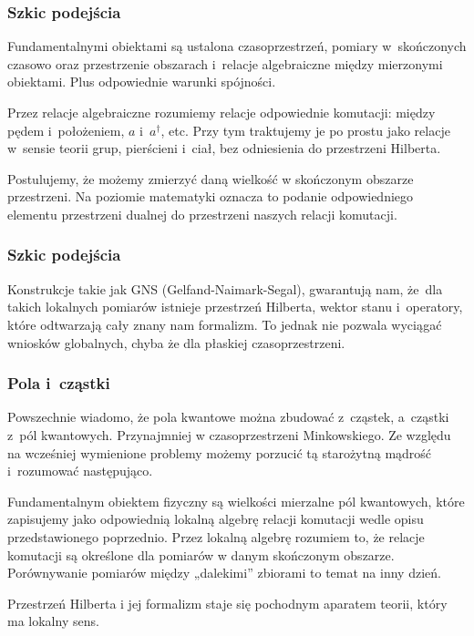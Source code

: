 \documentclass[10pt,t]{beamer}
\begin{document}
\begin{frame}
  \frametitle{Szkic podejścia}


  Fundamentalnymi obiektami są ustalona czasoprzestrzeń, pomiary
  w~skończonych czasowo oraz przestrzenie obszarach i~relacje
  algebraiczne między mierzonymi obiektami. Plus odpowiednie warunki
  spójności.

  Przez relacje algebraiczne rozumiemy relacje odpowiednie komutacji:
  między pędem i~położeniem, $a$ i~$a^{ \dagger }$, etc. Przy tym
  traktujemy je po prostu jako relacje w~sensie teorii grup,
  pierścieni i~ciał, bez odniesienia do przestrzeni Hilberta.

  Postulujemy, że możemy zmierzyć daną wielkość w skończonym obszarze
  przestrzeni. Na poziomie matematyki oznacza to podanie odpowiedniego
  elementu przestrzeni dualnej do przestrzeni naszych relacji
  komutacji.

\end{frame}





\begin{frame}
  \frametitle{Szkic podejścia}


  Konstrukcje takie jak GNS (Gelfand-Naimark-Segal), gwarantują nam,
  że~dla takich lokalnych pomiarów istnieje przestrzeń Hilberta,
  wektor stanu i~operatory, które odtwarzają cały znany nam formalizm.
  To jednak nie pozwala wyciągać wniosków globalnych, chyba że dla
  płaskiej czasoprzestrzeni.

\end{frame}





\begin{frame}
  \frametitle{Pola i~cząstki}


  Powszechnie wiadomo, że pola kwantowe można zbudować z~cząstek,
  a~cząstki z~pól kwantowych. Przynajmniej w czasoprzestrzeni
  Minkowskiego. Ze względu na wcześniej wymienione problemy możemy
  porzucić tą starożytną mądrość i~rozumować następująco.

  Fundamentalnym obiektem fizyczny są wielkości mierzalne pól
  kwantowych, które zapisujemy jako odpowiednią lokalną algebrę
  relacji komutacji wedle opisu przedstawionego poprzednio. Przez
  lokalną algebrę rozumiem to, że relacje komutacji są określone dla
  pomiarów w danym skończonym obszarze. Porównywanie pomiarów między
  „dalekimi” zbiorami to temat na inny dzień.

  Przestrzeń Hilberta i jej formalizm staje się pochodnym aparatem
  teorii, który ma lokalny sens.

\end{frame}
\end{document}
